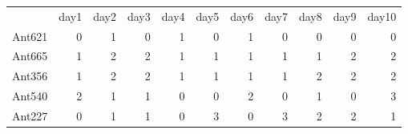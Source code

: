 \begin{tabular}{lrrrrrrrrrr}
{} & {day1} & {day2} & {day3} & {day4} & {day5} & {day6} & {day7} & {day8} & {day9} & {day10} \\
Ant621 & {\cellcolor[HTML]{66C5CC}} \color[HTML]{111111} 0 & {\cellcolor[HTML]{F6CF71}} \color[HTML]{111111} 1 & {\cellcolor[HTML]{66C5CC}} \color[HTML]{111111} 0 & {\cellcolor[HTML]{F6CF71}} \color[HTML]{111111} 1 & {\cellcolor[HTML]{66C5CC}} \color[HTML]{111111} 0 & {\cellcolor[HTML]{F6CF71}} \color[HTML]{111111} 1 & {\cellcolor[HTML]{66C5CC}} \color[HTML]{111111} 0 & {\cellcolor[HTML]{66C5CC}} \color[HTML]{111111} 0 & {\cellcolor[HTML]{66C5CC}} \color[HTML]{111111} 0 & {\cellcolor[HTML]{66C5CC}} \color[HTML]{111111} 0 \\
Ant665 & {\cellcolor[HTML]{F6CF71}} \color[HTML]{111111} 1 & {\cellcolor[HTML]{F89C74}} \color[HTML]{111111} 2 & {\cellcolor[HTML]{F89C74}} \color[HTML]{111111} 2 & {\cellcolor[HTML]{F6CF71}} \color[HTML]{111111} 1 & {\cellcolor[HTML]{F6CF71}} \color[HTML]{111111} 1 & {\cellcolor[HTML]{F6CF71}} \color[HTML]{111111} 1 & {\cellcolor[HTML]{F6CF71}} \color[HTML]{111111} 1 & {\cellcolor[HTML]{F6CF71}} \color[HTML]{111111} 1 & {\cellcolor[HTML]{F89C74}} \color[HTML]{111111} 2 & {\cellcolor[HTML]{F89C74}} \color[HTML]{111111} 2 \\
Ant356 & {\cellcolor[HTML]{F6CF71}} \color[HTML]{111111} 1 & {\cellcolor[HTML]{F89C74}} \color[HTML]{111111} 2 & {\cellcolor[HTML]{F89C74}} \color[HTML]{111111} 2 & {\cellcolor[HTML]{F6CF71}} \color[HTML]{111111} 1 & {\cellcolor[HTML]{F6CF71}} \color[HTML]{111111} 1 & {\cellcolor[HTML]{F6CF71}} \color[HTML]{111111} 1 & {\cellcolor[HTML]{F6CF71}} \color[HTML]{111111} 1 & {\cellcolor[HTML]{F89C74}} \color[HTML]{111111} 2 & {\cellcolor[HTML]{F89C74}} \color[HTML]{111111} 2 & {\cellcolor[HTML]{F89C74}} \color[HTML]{111111} 2 \\
Ant540 & {\cellcolor[HTML]{F89C74}} \color[HTML]{111111} 2 & {\cellcolor[HTML]{F6CF71}} \color[HTML]{111111} 1 & {\cellcolor[HTML]{F6CF71}} \color[HTML]{111111} 1 & {\cellcolor[HTML]{66C5CC}} \color[HTML]{111111} 0 & {\cellcolor[HTML]{66C5CC}} \color[HTML]{111111} 0 & {\cellcolor[HTML]{F89C74}} \color[HTML]{111111} 2 & {\cellcolor[HTML]{66C5CC}} \color[HTML]{111111} 0 & {\cellcolor[HTML]{F6CF71}} \color[HTML]{111111} 1 & {\cellcolor[HTML]{66C5CC}} \color[HTML]{111111} 0 & {\cellcolor[HTML]{DCB0F2}} \color[HTML]{111111} 3 \\
Ant227 & {\cellcolor[HTML]{66C5CC}} \color[HTML]{111111} 0 & {\cellcolor[HTML]{F6CF71}} \color[HTML]{111111} 1 & {\cellcolor[HTML]{F6CF71}} \color[HTML]{111111} 1 & {\cellcolor[HTML]{66C5CC}} \color[HTML]{111111} 0 & {\cellcolor[HTML]{DCB0F2}} \color[HTML]{111111} 3 & {\cellcolor[HTML]{66C5CC}} \color[HTML]{111111} 0 & {\cellcolor[HTML]{DCB0F2}} \color[HTML]{111111} 3 & {\cellcolor[HTML]{F89C74}} \color[HTML]{111111} 2 & {\cellcolor[HTML]{F89C74}} \color[HTML]{111111} 2 & {\cellcolor[HTML]{F6CF71}} \color[HTML]{111111} 1 \\

\end{tabular}
